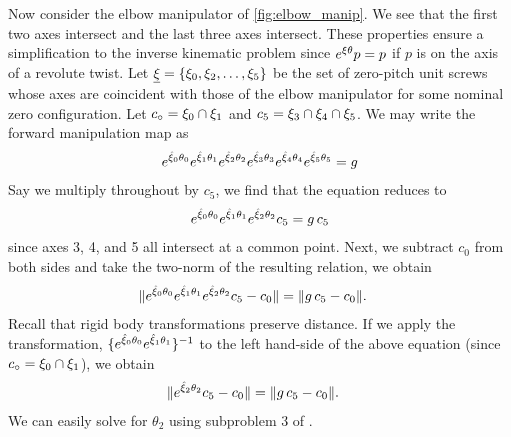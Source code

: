 \begin{example}
	Now consider the elbow manipulator of \autoref{fig:elbow_manip}. We see that the first two axes intersect and the last three axes intersect. These properties ensure a simplification to the inverse kinematic problem since $e^{\xi\theta}p = p$ if $p$ is on the axis of a revolute twist. 
	Let $\underline{\xi} = \{\xi_0, \xi_2, \ldots, \xi_5\}$ be the set of zero-pitch unit screws whose axes are coincident with those of the elbow manipulator for some nominal zero configuration. Let $c_\circ = \xi_0 \cap \xi_1$ and $c_5 = \xi_3 \cap \xi_4 \cap \xi_5$. We may write the forward manipulation map as 
	\begin{align}
		{e^{\hat{\xi}_{0} \theta_0} } {e^{\hat{\xi}_{1} \theta_1} }{e^{\hat{\xi}_{2} \theta_2} }{e^{\hat{\xi}_{3} \theta_3} }{e^{\hat{\xi}_{4} \theta_4} }{e^{\hat{\xi}_{5} \theta_5} }=g
		\label{eq:elbow_fwd}
	\end{align}
	Say we multiply throughout by $c_5$, we find that the equation reduces to 
	\begin{align}
	{e^{\hat{\xi}_{0} \theta_0} } {e^{\hat{\xi}_{1} \theta_1} }{e^{\hat{\xi}_{2} \theta_2} }c_5=g \, c_5
	\end{align}
	since axes 3, 4, and 5 all intersect at a common point.  Next, we subtract $c_0$ from both sides and take the two-norm of the resulting relation, we obtain
	\begin{align}
		\|{e^{\hat{\xi}_{0} \theta_0} } {e^{\hat{\xi}_{1} \theta_1} }{e^{\hat{\xi}_{2} \theta_2} } c_5 - c_0\|&=\|g \, c_5 - c_0\|.
	\end{align}
	Recall that rigid body transformations preserve distance. If we apply the transformation, $\{{e^{\hat{\xi}_{0} \theta_0} } {e^{\hat{\xi}_{1} \theta_1} }\}^{-1}$ to the left hand-side of the above equation (since $c_\circ = \xi_0 \cap \xi_1$), we obtain
	\begin{align}
	\|{e^{\hat{\xi}_{2} \theta_2} } c_5 - c_0\|&=\|g \, c_5 - c_0\|.
	\end{align}
	We can easily solve for $\theta_2$ using subproblem 3 of \cite[pp 102]{MurrayBook}.
	

\end{example}
